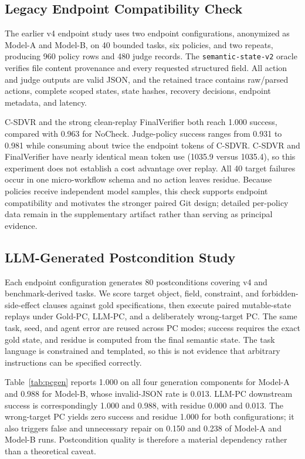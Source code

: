 \documentclass[pdflatex,sn-apa]{sn-jnl}
\begin{document}
\subsection{Legacy Endpoint Compatibility Check}

The earlier v4 endpoint study uses two endpoint configurations, anonymized as Model-A and Model-B, on 40 bounded tasks, six policies, and two repeats, producing 960 policy rows and 480 judge records. The \texttt{semantic-state-v2} oracle verifies file content provenance and every requested structured field. All action and judge outputs are valid JSON, and the retained trace contains raw/parsed actions, complete scoped states, state hashes, recovery decisions, endpoint metadata, and latency.

C-SDVR and the strong clean-replay FinalVerifier both reach 1.000 success, compared with 0.963 for NoCheck. Judge-policy success ranges from 0.931 to 0.981 while consuming about twice the endpoint tokens of C-SDVR. C-SDVR and FinalVerifier have nearly identical mean token use (1035.9 versus 1035.4), so this experiment does not establish a cost advantage over replay. All 40 target failures occur in one micro-workflow schema and no action leaves residue. Because policies receive independent model samples, this check supports endpoint compatibility and motivates the stronger paired Git design; detailed per-policy data remain in the supplementary artifact rather than serving as principal evidence.

\subsection{LLM-Generated Postcondition Study}

Each endpoint configuration generates 80 postconditions covering v4 and benchmark-derived tasks. We score target object, field, constraint, and forbidden-side-effect clauses against gold specifications, then execute paired mutable-state replays under Gold-PC, LLM-PC, and a deliberately wrong-target PC. The same task, seed, and agent error are reused across PC modes; success requires the exact gold state, and residue is computed from the final semantic state. The task language is constrained and templated, so this is not evidence that arbitrary instructions can be specified correctly.

Table~\ref{tab:pcgen} reports 1.000 on all four generation components for Model-A and 0.988 for Model-B, whose invalid-JSON rate is 0.013. LLM-PC downstream success is correspondingly 1.000 and 0.988, with residue 0.000 and 0.013. The wrong-target PC yields zero success and residue 1.000 for both configurations; it also triggers false and unnecessary repair on 0.150 and 0.238 of Model-A and Model-B runs. Postcondition quality is therefore a material dependency rather than a theoretical caveat.
\end{document}
